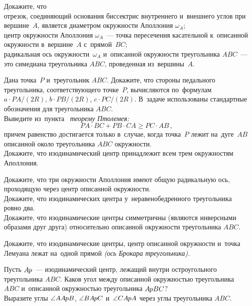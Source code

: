 \begin{problems}

\item
Докажите, что
\\
\subproblem
отрезок, соединяющий основания биссектрис внутреннего и~внешнего углов при
вершине~$A$, является диаметром окружности Аполлония $\omega_{A}$;
\\
\subproblem
центр окружности Аполлония $\omega_{A}$~--- точка пересечения касательной
к~описанной окружности в~вершине~$A$ с~прямой~$BC$;
\\
\subproblem
радикальная ось окружности~$\omega_{A}$ и~описанной окружности
треугольника $ABC$~--- это симедиана треугольника $ABC$, проведенная
из~вершины~$A$.

\item
\subproblem {}%
Дана точка~$P$ и~треугольник $ABC$.
Докажите, что стороны педального треугольника, соответствующего точке~$P$,
вычисляются по~формулам
$a \cdot PA / (2R)$, $b \cdot PB / (2R)$, $c \cdot PC / (2R)$.
В~задаче использованы стандартные обозначения для треугольника $ABC$.
\\
\subproblem
Выведите из~пункта~
\emph{теорему Птолемея:}
\[
    PA \cdot BC + PB \cdot CA
\geq
    PC \cdot AB
\, , \]
причем равенство достигается только в~случае, когда точка~$P$ лежит
на~дуге~$AB$ описанной около треугольника $ABC$ окружности.
\\
\subproblem
Докажите, что изодинамический центр принадлежит всем трем окружностям
Аполлония.

\item
\subproblem
Докажите, что три окружности Аполлония имеют общую радикальную ось, проходящую
через центр описанной окружности.
\\
\subproblem
Докажите, что изодинамических центра у~неравенобедренного треугольника ровно
два.
\\
\subproblem
Докажите, что изодинамические центры симметричны (являются инверсными образами
друг друга) относительно описанной окружности треугольника $ABC$.

\item
Докажите, что изодинамические центры, центр описанной окружности
и~точка Лемуана лежат на~одной прямой \emph{(ось Брокара треугольника).}

\item
\subproblem
Пусть $A\mspace{-1mu}p$~--- изодинамический центр, лежащий внутри остроугольного
треугольника $ABC$.
Каков угол между описанной окружностью треугольника $ABC$ и~описанной
окружностью треугольника $A\mspace{-1mu}p B C$?
\\
\subproblem
Выразите углы $\angle A A\mspace{-1mu}p B$, $\angle B A\mspace{-1mu}p C$ и~$\angle C A\mspace{-1mu}p A$ через углы
треугольника $ABC$.

\end{problems}

\endgroup %

